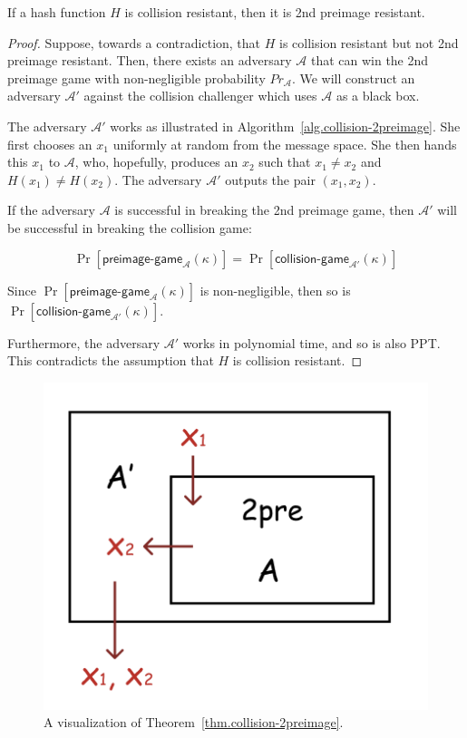 \begin{theorem}
  \label{thm.collision-2preimage}
  If a hash function $H$ is collision resistant, then it is 2nd preimage resistant.
\end{theorem}
\begin{proof}
  Suppose, towards a contradiction, that $H$ is collision resistant but not 2nd preimage resistant.
  Then, there exists an adversary $\mathcal{A}$ that can win the 2nd preimage game with non-negligible probability $Pr_\mathcal{A}$. We will construct an adversary $\mathcal{A}'$ against the
  collision challenger which uses $\mathcal{A}$ as a black box.

  The adversary $\mathcal{A}'$ works as illustrated in Algorithm~\ref{alg.collision-2preimage}. She first chooses an $x_1$ uniformly at random from the message space. She then hands this $x_1$ to $\mathcal{A}$, who, hopefully, produces an $x_2$ such that $x_1 \neq x_2$ and $H(x_1) \neq H(x_2)$. The adversary $\mathcal{A}'$ outputs the pair $(x_1, x_2)$.

  If the adversary $\mathcal{A}$ is successful in breaking the 2nd preimage game, then $\mathcal{A}'$ will be successful in breaking the collision game:

  \[
    \Pr[\textsf{preimage-game}_\mathcal{A}(\kappa)]
    =
    \Pr[\textsf{collision-game}_{\mathcal{A}'}(\kappa)]
  \]

  Since $\Pr[\textsf{preimage-game}_\mathcal{A}(\kappa)]$ is non-negligible, then so is $\Pr[\textsf{collision-game}_{\mathcal{A}'}(\kappa)]$.

  Furthermore, the adversary $\mathcal{A}'$ works in polynomial time, and so is also PPT. This contradicts the assumption that $H$ is collision resistant.
\end{proof}

\begin{figure}[H]
    \centering
    \includegraphics[scale=0.6]{figures/2pre.png}
    \caption{A visualization of Theorem~\ref{thm.collision-2preimage}.}
    \label{fig:2pre_viz}
\end{figure}

